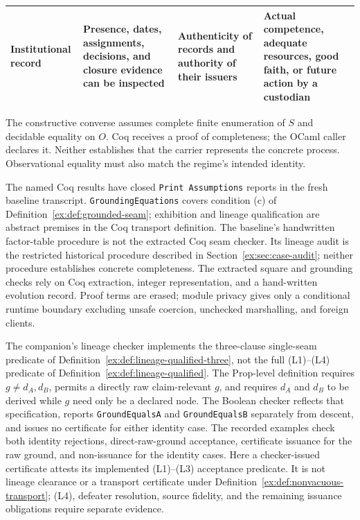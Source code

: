 \documentclass[11pt]{article}
\theoremstyle{definition}
\newcommand{\code}[1]{\texttt{#1}}
\begin{document}
\begin{table}[htbp]
\begin{tabularx}{\textwidth}{@{}P{2.1cm}LLL@{}}
Institutional record & Presence, dates, assignments, decisions, and closure evidence can be inspected & Authenticity of records and authority of their issuers & Actual competence, adequate resources, good faith, or future action by a custodian \\
\bottomrule
\end{tabularx}
\end{table}
\FloatBarrier

The constructive converse assumes complete finite enumeration of $S$ and decidable equality on $O$. Coq receives a proof of completeness; the OCaml caller declares it. Neither establishes that the carrier represents the concrete process. Observational equality must also match the regime's intended identity.

The named Coq results have closed \code{Print Assumptions} reports in the fresh baseline transcript. \code{GroundingEquations} covers condition (c) of Definition~\ref{ex:def:grounded-seam}; exhibition and lineage qualification are abstract premises in the Coq transport definition. The baseline's handwritten factor-table procedure is not the extracted Coq seam checker. Its lineage audit is the restricted historical procedure described in Section~\ref{ex:sec:case-audit}; neither procedure establishes concrete completeness. The extracted square and grounding checks rely on Coq extraction, integer representation, and a hand-written evolution record. Proof terms are erased; module privacy gives only a conditional runtime boundary excluding unsafe coercion, unchecked marshalling, and foreign clients.

The companion's lineage checker implements the three-clause single-seam predicate of Definition~\ref{ex:def:lineage-qualified-three}, not the full (L1)--(L4) predicate of Definition~\ref{ex:def:lineage-qualified}. The Prop-level definition requires $g\neq d_A,d_B$, permits a directly raw claim-relevant $g$, and requires $d_A$ and $d_B$ to be derived while $g$ need only be a declared node. The Boolean checker reflects that specification, reports \code{GroundEqualsA} and \code{GroundEqualsB} separately from descent, and issues no certificate for either identity case. The recorded examples check both identity rejections, direct-raw-ground acceptance, certificate issuance for the raw ground, and non-issuance for the identity cases. Here a checker-issued certificate attests its implemented (L1)--(L3) acceptance predicate. It is not lineage clearance or a transport certificate under Definition~\ref{ex:def:nonvacuous-transport}; (L4), defeater resolution, source fidelity, and the remaining issuance obligations require separate evidence.
\end{document}
